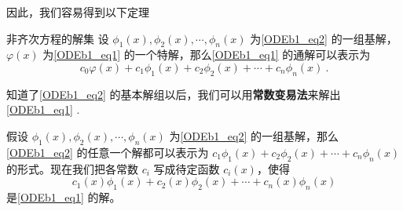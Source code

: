 因此，我们容易得到以下定理
\begin{theorem}{非齐次方程的解集}
设 $\phi_1(x), \phi_2(x), \cdots, \phi_n(x)$ 为\autoref{ODEb1_eq2} 的一组基解，$\varphi(x)$ 为\autoref{ODEb1_eq1} 的一个特解，那么\autoref{ODEb1_eq1} 的通解可以表示为
\begin{equation}
c_0\varphi(x)+c_1\phi_1(x)+c_2\phi_2(x)+\cdots+c_n\phi_n(x)~.
\end{equation}
\end{theorem}

知道了\autoref{ODEb1_eq2} 的基本解组以后，我们可以用\textbf{常数变易法}来解出\autoref{ODEb1_eq1} .

假设 $\phi_1(x), \phi_2(x), \cdots, \phi_n(x)$ 为\autoref{ODEb1_eq2} 的一组基解，那么\autoref{ODEb1_eq2} 的任意一个解都可以表示为 $c_1\phi_1(x)+c_2\phi_2(x)+\cdots+c_n\phi_n(x)$ 的形式。现在我们把各常数 $c_i$ 写成待定函数 $c_i(x)$，使得
\begin{equation}
c_1(x)\phi_1(x)+c_2(x)\phi_2(x)+\cdots+c_n(x)\phi_n(x)
\end{equation}
是\autoref{ODEb1_eq1} 的解。

